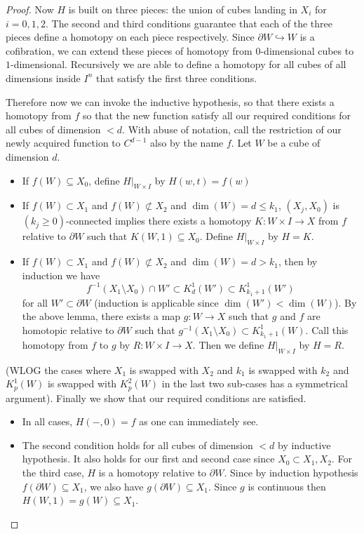 \begin{lmm}{}{}
\begin{proof}
Now $H$ is built on three pieces: the union of cubes landing in $X_i$ for $i=0,1,2$. The second and third conditions guarantee that each of the three pieces define a homotopy on each piece respectively. Since $\partial W\hookrightarrow W$ is a cofibration, we can extend these pieces of homotopy from $0$-dimensional cubes to $1$-dimensional. Recursively we are able to define a homotopy for all cubes of all dimensions inside $I^n$ that satisfy the first three conditions. 

Therefore now we can invoke the inductive hypothesis, so that there exists a homotopy from $f$ so that the new function satisfy all our required conditions for all cubes of dimension $<d$. With abuse of notation, call the restriction of our newly acquired function to $C^{d-1}$ also by the name $f$. Let $W$ be a cube of dimension $d$. 
\begin{itemize}
\item If $f(W)\subseteq X_0$, define $H|_{W\times I}$ by $H(w,t)=f(w)$
\item If $f(W)\subset X_1$ and $f(W)\not\subset X_2$ and $\dim(W)=d\leq k_1$, $(X_j,X_0)$ is $(k_j\geq 0)$-connected implies there exists a homotopy $K:W\times I\to X$ from $f$ relative to $\partial W$ such that $K(W,1)\subseteq X_0$. Define $H|_{W\times I}$ by $H=K$. 
\item If $f(W)\subset X_1$ and $f(W)\not\subset X_2$ and $\dim(W)=d>k_1$, then by induction we have $$f^{-1}(X_1\setminus X_0)\cap W'\subset K_d^1(W')\subset K_{k_1+1}^1(W')$$ for all $W'\subset\partial W$ (induction is applicable since $\dim(W')<\dim(W)$). By the above lemma, there exists a map $g:W\to X$ such that $g$ and $f$ are homotopic relative to $\partial W$ such that $g^{-1}(X_1\setminus X_0)\subset K_{k_1+1}^1(W)$. Call this homotopy from $f$ to $g$ by $R:W\times I\to X$. Then we define $H|_{W\times I}$ by $H=R$. 
\end{itemize}
(WLOG the cases where $X_1$ is swapped with $X_2$ and $k_1$ is swapped with $k_2$ and $K_p^1(W)$ is swapped with $K_p^2(W)$ in the last two sub-cases has a symmetrical argument). Finally we show that our required conditions are satisfied. 
\begin{itemize}
\item In all cases, $H(-,0)=f$ as one can immediately see. 
\item The second condition holds for all cubes of dimension $<d$ by inductive hypothesis. It also holds for our first and second case since $X_0\subset X_1,X_2$. For the third case, $H$ is a homotopy relative to $\partial W$. Since by induction hypothesis $f(\partial W)\subseteq X_1$, we also have $g(\partial W)\subseteq X_1$. Since $g$ is continuous then $H(W,1)=g(W)\subseteq X_1$. 

\end{itemize}
\end{proof}
\end{lmm}

